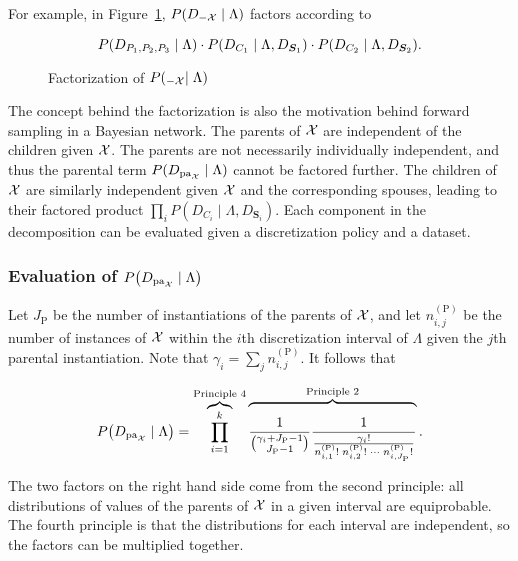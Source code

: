 For example, in Figure~\ref{fig:example_factorization}, $P(D_{-\mathcal{X}} \mid \Lambda)$ factors according to

\begin{equation}
  P\paren{D_{P_1,P_2,P_3} \mid \Lambda} \cdot P\paren{ D_{ C_1 } \mid \Lambda, D_{\bm{S}_1} } \cdot P\paren{D_{C_2} \mid \Lambda, D_{\bm{S}_2}}\text{.}
\end{equation}

\begin{figure}[ht]
  \centering
  
  \caption{Factorization of $P(_{-\mathcal{X}} \mid \Lambda)$}
  \label{fig:example_factorization}
\end{figure}

The concept behind the factorization is also the motivation behind forward sampling in a Bayesian network.
The parents of $\mathcal{X}$ are independent of the children given $\mathcal{X}$.
The parents are not necessarily individually independent, and thus the parental term $P(D_{\operatorname{pa}_{\mathcal{X}}} \mid \Lambda)$ cannot be factored further.
The children of $\mathcal{X}$ are similarly independent given $\mathcal{X}$ and the corresponding spouses, leading to their factored product $\prod_{i} P(D_{C_i} \mid \Lambda, D_{\bm{S}_i})$.
Each component in the decomposition can be evaluated given a discretization policy and a dataset.

\subsubsection{Evaluation of $P\paren{D_{\Pa_{\cX}} \mid \Lambda}$}

Let $J_\text{P}$ be the number of instantiations of the parents of $\mathcal{X}$, and let $n^{(\text{P})}_{i,j}$ be the number of instances of $\mathcal{X}$ within the $i$th discretization interval of $\Lambda$ given the $j$th parental instantiation.
Note that $\gamma_i = \sum_j n^{(\text{P})}_{i,j}$.
It follows that

\begin{equation}
  \label{eq:likelihood_one}
  P\paren{D_{\Pa_{\cX}} \mid \Lambda} = \overbrace{\prod_{i=1}^k}^{\text{Principle 4}}
    \overbrace{\rule{0pt}{2em}
      \frac{1}{{{\gamma_i + J_\text{P} - 1}\choose{J_\text{P} - 1}}}
      \frac{1}{
        \frac{
          {\gamma_i}!
        }{
          {n^{(\text{P})}_{i,1}}! \; {n^{(\text{P})}_{i,2}}! \; \cdots \; {n^{(\text{P})}_{i,J_\text{P}}}!
        }
      }
    }^{\text{Principle 2}}\text{.}
\end{equation}

The two factors on the right hand side come from the second principle: all distributions of values of the parents of $\mathcal{X}$ in a given interval are equiprobable.
The fourth principle is that the distributions for each interval are independent, so the factors can be multiplied together.

